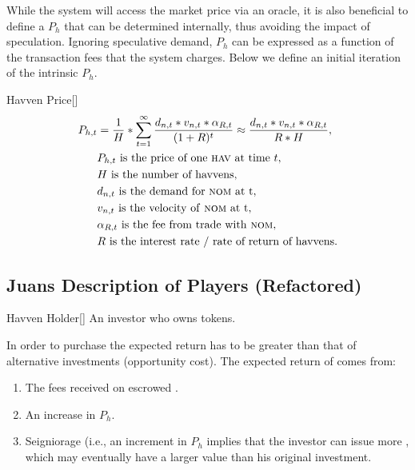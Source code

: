 \noindent While the system will access the market price via an oracle, it is also beneficial to define a $P_h$ that can be determined internally, thus avoiding the impact of speculation. Ignoring speculative demand, $P_h$ can be expressed as a function of the transaction fees that the system charges. Below we define an initial iteration of the intrinsic $P_h$.

\begin{namedthm}{Havven Price}[]
\begin{align*} 
P_{h,t} &= \frac{1}{H}* \sum\limits_{t=1}^\infty \frac{d_{n,t} *v_{n,t} * \alpha_{R,t}}{(1+R)^t} \approx \frac{d_{n,t} *v_{n,t} * \alpha_{R,t}}{R * H}, \\
& P_{h,t} \text{ is the price of one \textsc{hav}{} at time } t, \\
& H \text{ is the number of havvens}, \\
& d_{n,t} \text{ is the demand for \textsc{nom}{} at t}, \\
& v_{n,t} \text{ is the velocity of \textsc{nom}{} at t}, \\
& \alpha_{R,t} \text{ is the fee from trade with \textsc{nom}{}}, \\
& R \text{ is the interest rate / rate of return of havvens}. \\
\end{align*}
\end{namedthm}

\newpage

\subsection{Juans Description of Players (Refactored)}
\begin{namedthm}{Havven Holder}[]
An investor who owns \HAV{} tokens.
\end{namedthm}

\noindent In order to purchase \HAV{} the expected return has to be greater than that of alternative investments (opportunity cost). The expected return of \HAV{} comes from:
\begin{enumerate}
\item{The fees received on escrowed \HAV{}.}
\item{An increase in $P_h$.}
\item{Seigniorage (i.e., an increment in $P_h$ implies that the investor can issue more \NOM{}, which may eventually have a larger value than his original investment.}
\end{enumerate}

